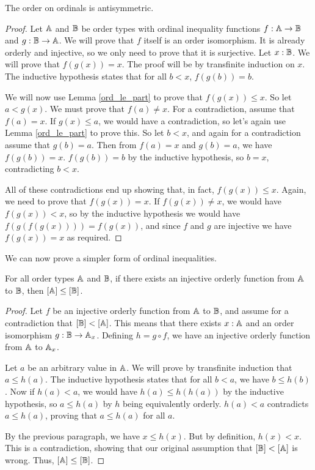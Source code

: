 \documentclass[../../math.tex]{subfiles}
\begin{document}
\begin{instance}
    The order on ordinals is antisymmetric.
\end{instance}
\begin{proof}
    Let $\mathbb{A}$ and $\mathbb{B}$ be order types with ordinal inequality functions $f : \mathbb{A}
    \to \mathbb{B}$ and $g : \mathbb{B} \to \mathbb{A}$.  We will prove that $f$ itself is an order
    isomorphism.  It is already orderly and injective, so we only
    need to prove that it is surjective.  Let $x : \mathbb{B}$.  We will prove that
    $f(g(x)) = x$.  The proof will be by transfinite induction on $x$.  The
    inductive hypothesis states that for all $b < x$, $f(g(b)) = b$.

    We will now use Lemma \ref{ord_le_part} to prove that $f(g(x)) \leq x$.  So
    let $a < g(x)$.  We must prove that $f(a) \neq x$.  For a contradiction,
    assume that $f(a) = x$.  If $g(x) \leq a$, we would have a contradiction, so
    let's again use Lemma \ref{ord_le_part} to prove this.  So let $b < x$, and
    again for a contradiction assume that $g(b) = a$.  Then from $f(a) = x$ and
    $g(b) = a$, we have $f(g(b)) = x$.  $f(g(b)) = b$ by the inductive
    hypothesis, so $b = x$, contradicting $b < x$.

    All of these contradictions end up showing that, in fact, $f(g(x)) \leq x$.
    Again, we need to prove that $f(g(x)) = x$.  If $f(g(x)) \neq x$, we would
    have $f(g(x)) < x$, so by the inductive hypothesis we would have
    $f(g(f(g(x)))) = f(g(x))$, and since $f$ and $g$ are injective we have
    $f(g(x)) = x$ as required.
\end{proof}

We can now prove a simpler form of ordinal inequalities.

\begin{lemma} \label{ord_le_simpl}
    For all order types $\mathbb{A}$ and $\mathbb{B}$, if there exists an injective orderly
    function from $\mathbb{A}$ to $\mathbb{B}$, then $[\mathbb{A}] \leq [\mathbb{B}]$.
\end{lemma}
\begin{proof}
    Let $f$ be an injective orderly function from $\mathbb{A}$ to $\mathbb{B}$, and assume for a
    contradiction that $[\mathbb{B}] < [\mathbb{A}]$.  This means that there exists $x : \mathbb{A}$ and
    an order isomorphism $g : \mathbb{B} \to \mathbb{A}_x$.  Defining $h = g \circ f$, we have
    an injective orderly function from $\mathbb{A}$ to $\mathbb{A}_x$.

    Let $a$ be an arbitrary value in $\mathbb{A}$.  We will prove by transfinite
    induction that $a \leq h(a)$.  The inductive hypothesis states that for all
    $b < a$, we have $b \leq h(b)$.  Now if $h(a) < a$, we would have $h(a) \leq
    h(h(a))$ by the inductive hypothesis, so $a \leq h(a)$ by $h$ being
    equivalently orderly.  $h(a) < a$ contradicts $a \leq h(a)$, proving that $a
    \leq h(a)$ for all $a$.

    By the previous paragraph, we have $x \leq h(x)$.  But by definition, $h(x)
    < x$.  This is a contradiction, showing that our original assumption that
    $[\mathbb{B}] < [\mathbb{A}]$ is wrong.  Thus, $[\mathbb{A}] \leq [\mathbb{B}]$.
\end{proof}
\end{document}
